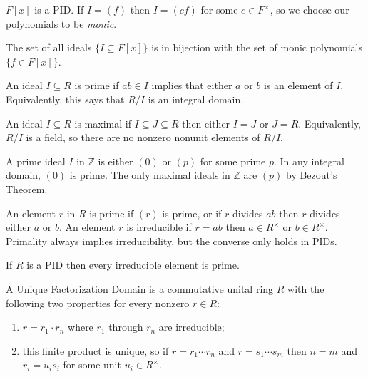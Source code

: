 \begin{corollary}
$F[x]$ is a PID. If $I = (f)$ then $I = (cf)$ for some $c \in F^\times$, so we choose our polynomials to be \emph{monic}.
\end{corollary}

\begin{corollary}
The set of all ideals $\{I \subseteq F[x]\}$ is in bijection with the set of monic polynomials $\{f \in F[x]\}$.
\end{corollary}

\begin{definition}
An ideal $I \subseteq R$ is prime if $ab \in I$ implies that either $a$ or $b$ is an element of $I$. Equivalently, this says that $R / I$ is an integral domain.
\end{definition}

\begin{definition}
An ideal $I \subseteq R$ is maximal if $I \subseteq J \subseteq R$ then either $I = J$ or $J = R$. Equivalently, $R/I$ is a field, so there are no nonzero nonunit elements of $R/I$.
\end{definition}

\begin{example}
A prime ideal $I$ in $\mathbb{Z}$ is either $(0)$ or $(p)$ for some prime $p$. In any integral domain, $(0)$ is prime. The only maximal ideals in $\mathbb{Z}$ are $(p)$ by Bezout's Theorem.
\end{example}

\begin{definition}
An element $r$ in $R$ is prime if $(r)$ is prime, or if $r$ divides $ab$ then $r$ divides either $a$ or $b$. An element $r$ is irreducible if $r = ab$ then $a \in R^\times$ or $b \in R^\times$. Primality always implies irreducibility, but the converse only holds in PIDs.
\end{definition}

\begin{lemma}
If $R$ is a PID then every irreducible element is prime.
\end{lemma}

\begin{definition}[UFD]
A Unique Factorization Domain is a commutative unital ring $R$ with the following two properties for every nonzero $r \in R$:
\begin{enumerate}
\item $r = r_1 \cdot r_n$ where $r_1$ through $r_n$ are irreducible;
\item this finite product is unique, so if $r = r_1 \cdots r_n$ and $r = s_1 \cdots s_m$ then $n = m$ and $r_i = u_i s_i$ for some unit $u_i \in R^\times$.
\end{enumerate}
\end{definition}

